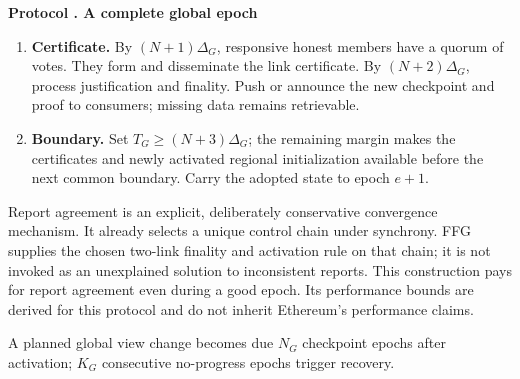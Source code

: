 \documentclass[11pt,a4paper,onecolumn]{article}
\newcommand{\Tag}[1]{\mathsf{#1}}
\theoremstyle{remark}\newtheorem{example}[definition]{Example}
\newcounter{protocol}
\newenvironment{protocol}[2]{\refstepcounter{protocol}\label{#1}\begin{mdframed}[nobreak=true,linewidth=.6pt,skipabove=10pt,skipbelow=10pt,innertopmargin=8pt,innerbottommargin=8pt]\small\raggedright\noindent\textbf{Protocol \theprotocol. #2}\par\smallskip}{\end{mdframed}}
\begin{document}
\begin{protocol}{alg:global}{A complete global epoch}
\begin{enumerate}[label=\textbf{G\arabic*.}]
signs $(\Tag{FFG},c,e-1,g_{e-1},e,g_e)$ after the checks in
\cref{alg:finality}. Disseminate the vote through the backbone.
\item \textbf{Certificate.} By $(N+1)\Delta_G$, responsive honest members
have a quorum of votes. They form and disseminate the link certificate.
By $(N+2)\Delta_G$, process justification and finality. Push or announce the
new checkpoint and proof to consumers; missing data remains retrievable.
\item \textbf{Boundary.} Set $T_G\geq(N+3)\Delta_G$; the remaining margin
makes the certificates and newly activated regional initialization available
before the next common boundary. Carry the adopted state to epoch $e+1$.
\end{enumerate}
\end{protocol}

Report agreement is an explicit, deliberately conservative convergence mechanism.
It already selects a unique control chain under synchrony. FFG supplies the
chosen two-link finality and activation rule on that chain; it is not invoked
as an unexplained solution to inconsistent reports. This construction pays for
report agreement even during a good epoch. Its performance bounds are derived
for this protocol and do not inherit Ethereum's performance claims.

A planned global view change becomes due $N_G$ checkpoint epochs after
activation; $K_G$ consecutive no-progress epochs trigger recovery.
\end{document}
